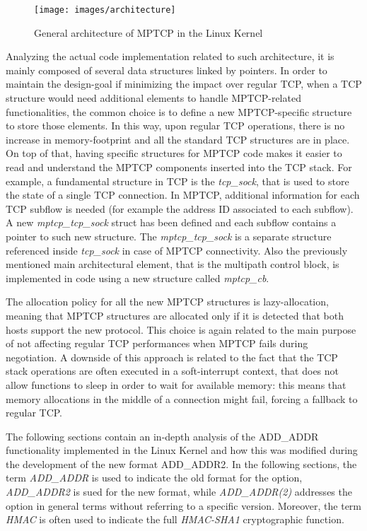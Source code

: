 \begin{figure}[!htb]
\centering
\texttt{[image: images/architecture]}
\caption{General architecture of MPTCP in the Linux Kernel}
\label{fig:architecture}
\end{figure}

Analyzing the actual code implementation related to such architecture, it is mainly composed of several data structures linked by pointers. In order to maintain the design-goal if minimizing the impact over regular TCP, when a TCP structure would need additional elements to handle MPTCP-related functionalities, the common choice is to define a new MPTCP-specific structure to store those elements. In this way, upon regular TCP operations, there is no increase in memory-footprint and all the standard TCP structures are in place. On top of that, having specific structures for MPTCP code makes it easier to read and understand the MPTCP components inserted into the TCP stack. For example, a fundamental structure in TCP is the \textit{tcp\_sock}, that is used to store the state of a single TCP connection. In MPTCP, additional information for each TCP subflow is needed (for example the address ID associated to each subflow). A new \textit{mptcp\_tcp\_sock} struct has been defined and each subflow contains a pointer to such new structure. The \textit{mptcp\_tcp\_sock} is a separate structure referenced inside \textit{tcp\_sock} in case of MPTCP connectivity.
Also the previously mentioned main architectural element, that is the multipath control block, is implemented in code using a new structure called \textit{mptcp\_cb}.

The allocation policy for all the new MPTCP structures is lazy-allocation, meaning that MPTCP structures are allocated only if it is detected that both hosts support the new protocol. This choice is again related to the main purpose of not affecting regular TCP performances when MPTCP fails during negotiation. A downside of this approach is related to the fact that the TCP stack operations are often executed in a soft-interrupt context, that does not allow functions to sleep in order to wait for available memory: this means that memory allocations in the middle of a connection might fail, forcing a fallback to regular TCP. 

The following sections contain an in-depth analysis of the ADD\_ADDR functionality implemented in the Linux Kernel and how this was modified during the development of the new format ADD\_ADDR2. In the following sections, the term \textit{ADD\_ADDR} is used to indicate the old format for the option, \textit{ADD\_ADDR2} is sued for the new format, while \textit{ADD\_ADDR(2)} addresses the option in general terms without referring to a specific version. Moreover, the term \textit{HMAC} is often used to indicate the full \textit{HMAC-SHA1} cryptographic function.

